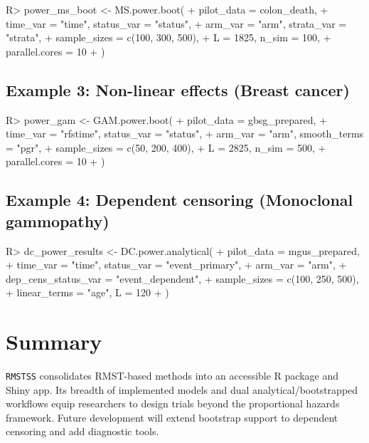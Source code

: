 \documentclass[article]{jss}
\begin{document}
\begin{Code}
R> power_ms_boot <- MS.power.boot(
+   pilot_data = colon_death,
+   time_var = "time", status_var = "status",
+   arm_var = "arm", strata_var = "strata",
+   sample_sizes = c(100, 300, 500),
+   L = 1825, n_sim = 100,
+   parallel.cores = 10
+ )
\end{Code}

\subsection{Example 3: Non-linear effects (Breast cancer)}
\begin{Code}
R> power_gam <- GAM.power.boot(
+   pilot_data = gbsg_prepared,
+   time_var = "rfstime", status_var = "status",
+   arm_var = "arm", smooth_terms = "pgr",
+   sample_sizes = c(50, 200, 400),
+   L = 2825, n_sim = 500,
+   parallel.cores = 10
+ )
\end{Code}

\subsection{Example 4: Dependent censoring (Monoclonal gammopathy)}
\begin{Code}
R> dc_power_results <- DC.power.analytical(
+   pilot_data = mgus_prepared,
+   time_var = "time", status_var = "event_primary",
+   arm_var = "arm",
+   dep_cens_status_var = "event_dependent",
+   sample_sizes = c(100, 250, 500),
+   linear_terms = "age", L = 120
+ )
\end{Code}

\section{Summary}
\texttt{RMSTSS} consolidates RMST-based methods into an accessible R package and Shiny app. Its breadth of implemented models and dual analytical/bootstrapped workflows equip researchers to design trials beyond the proportional hazards framework. Future development will extend bootstrap support to dependent censoring and add diagnostic tools.



\end{document}
